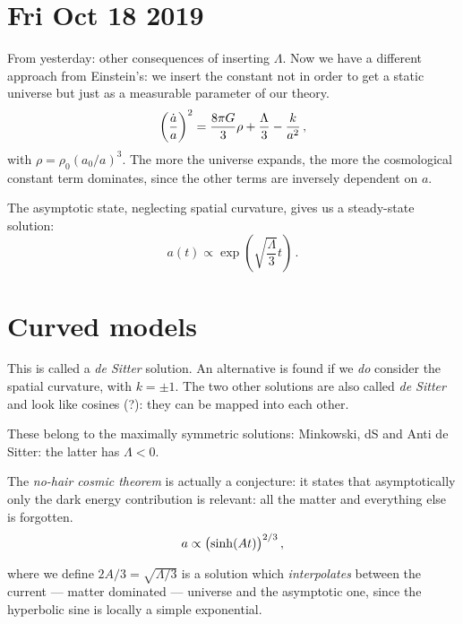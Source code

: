 \documentclass[main.tex]{subfiles}
\begin{document}
\section*{Fri Oct 18 2019}

From yesterday: other consequences of inserting \(\Lambda \).
Now we have a different approach from Einstein's: we insert the constant not in order to get a static universe but just as a measurable parameter of our theory. 
%
\begin{equation}
  \qty(\frac{\dot{a} }{a})^2 = \frac{8 \pi G }{3} \rho +\frac{\Lambda}{3} - \frac{k}{a^2}
\,,
\end{equation}
%
with \(\rho = \rho_0 (a_0 / a)^3\). The more the universe expands, the more the cosmological constant term dominates, since the other terms are inversely dependent on \(a\).

The asymptotic state, neglecting spatial curvature, gives us a steady-state solution: 
%
\begin{equation}
  a(t) \propto \exp(\sqrt{\frac{\Lambda}{3}} t) 
\,.
\end{equation}

\section{Curved models}

This is called a \emph{de Sitter} solution. An alternative is found if we \emph{do} consider the spatial curvature, with \(k = \pm 1\). The two other solutions are also called \emph{de Sitter} and look like cosines (?): they can be mapped into each other.


These belong to the maximally symmetric solutions: Minkowski, dS and Anti de Sitter: the latter has \(\Lambda < 0\).


The \emph{no-hair cosmic theorem} is actually a conjecture: it states that asymptotically only the dark energy contribution is relevant: all the matter and everything else is forgotten. 
%
\begin{equation}
  a \propto \qty(\sinh(At))^{2/3}
\,,
\end{equation}
%

where we define \(2A/3 = \sqrt{\Lambda /3} \) is a solution which \emph{interpolates} between the current --- matter dominated --- universe and the asymptotic one, since the hyperbolic sine is locally a simple exponential.
\end{document}
